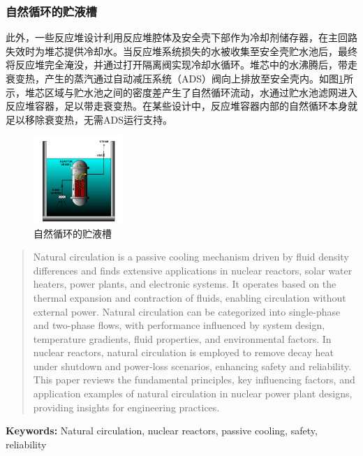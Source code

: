 \documentclass{article}
\begin{document}
\subsubsection{自然循环的贮液槽}

此外，一些反应堆设计利用反应堆腔体及安全壳下部作为冷却剂储存器，在主回路失效时为堆芯提供冷却水。当反应堆系统损失的水被收集至安全壳贮水池后，最终将反应堆完全淹没，并通过打开隔离阀实现冷却水循环。堆芯中的水沸腾后，带走衰变热，产生的蒸汽通过自动减压系统（ADS）阀向上排放至安全壳内。如图\ref{fig:liquid-tank}所示，堆芯区域与贮水池之间的密度差产生了自然循环流动，水通过贮水池滤网进入反应堆容器，足以带走衰变热。在某些设计中，反应堆容器内部的自然循环本身就足以移除衰变热，无需ADS运行支持。\cite{international2009iaea}

\begin{figure}[htbp]
    \centering
    \includegraphics[width=0.3\textwidth]{figures/liquid-tank.png}
    \caption{自然循环的贮液槽}
    \label{fig:liquid-tank}
\end{figure}



\begin{abstract}
    Natural circulation is a passive cooling mechanism driven by fluid density differences and finds extensive applications in nuclear reactors, solar water heaters, power plants, and electronic systems. It operates based on the thermal expansion and contraction of fluids, enabling circulation without external power. Natural circulation can be categorized into single-phase and two-phase flows, with performance influenced by system design, temperature gradients, fluid properties, and environmental factors. In nuclear reactors, natural circulation is employed to remove decay heat under shutdown and power-loss scenarios, enhancing safety and reliability. This paper reviews the fundamental principles, key influencing factors, and application examples of natural circulation in nuclear power plant designs, providing insights for engineering practices.
\end{abstract}

\textbf{Keywords:} Natural circulation, nuclear reactors, passive cooling, safety, reliability
\end{document}
